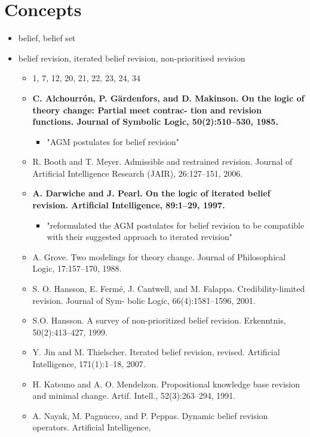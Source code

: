 \documentclass[11pt]{article}
\begin{document}
\section{Concepts}
\begin{itemize}
    \item belief, belief set
    \item belief revision, iterated belief revision, non-prioritised revision
    \begin{itemize}
        \item 1, 7, 12, 20, 21, 22, 23, 24, 34
        \item \textbf{C. Alchourrón, P. Gärdenfors, and D. Makinson. On the logic of theory change: Partial meet contrac- tion and revision functions. Journal of Symbolic Logic, 50(2):510–530, 1985.}
        \begin{itemize}
            \item "AGM postulates for belief revision"
        \end{itemize}
        \item R. Booth and T. Meyer. Admissible and restrained revision. Journal of Artificial Intelligence Research (JAIR), 26:127–151, 2006.
        \item \textbf{A. Darwiche and J. Pearl. On the logic of iterated belief revision. Artificial Intelligence, 89:1–29, 1997.}
        \begin{itemize}
            \item "reformulated the AGM postulates for belief revision to be compatible with their suggested approach to iterated revision"
        \end{itemize}
        \item A. Grove. Two modelings for theory change. Journal of Philosophical Logic, 17:157–170, 1988.
        \item S. O. Hansson, E. Fermé, J. Cantwell, and M. Falappa. Credibility-limited revision. Journal of Sym- bolic Logic, 66(4):1581–1596, 2001.
        \item S.O. Hansson. A survey of non-prioritized belief revision. Erkenntnis, 50(2):413–427, 1999.
        \item Y. Jin and M. Thielscher. Iterated belief revision, revised. Artificial Intelligence, 171(1):1–18, 2007.
        \item H. Katsuno and A. O. Mendelzon. Propositional knowledge base revision and minimal change. Artif. Intell., 52(3):263–294, 1991.
        \item A. Nayak, M. Pagnucco, and P. Peppas. Dynamic belief revision operators. Artificial Intelligence,

\end{itemize}
\end{itemize}
\end{document}
